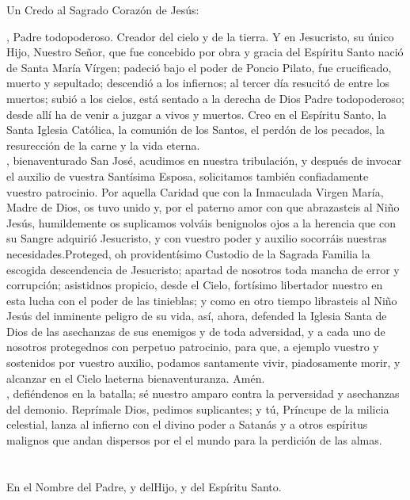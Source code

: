 \documentclass[10pt,a4paper,oneside]{book}
\begin{document}
\bigskip
{\label{creed-apostles}}
Un Credo al Sagrado Corazón de Jesús:\\
\smallskip
\begin{minipage}[t]{0.475\textwidth}
    , Padre todopoderoso. Creador del cielo y de la tierra. Y en Jesucristo, su único Hijo, Nuestro Señor,
    que fue concebido por obra y gracia del Espíritu Santo nació de Santa María Vírgen; padeció bajo el poder de Poncio Pilato,
    fue crucificado, muerto y sepultado; descendió a los infiernos; al tercer día resucitó de entre los muertos; subió a los cielos,
    está sentado a la derecha de Dios Padre todopoderoso; desde allí ha de venir a juzgar a vivos y muertos.
    Creo en el Espíritu Santo, la Santa Iglesia Católica, la comunión de los Santos, el perdón de los pecados,
    la resurección de la carne y la vida eterna. \\

    , bienaventurado San José, acudimos en nuestra tribulación, y después de invocar el auxilio de vuestra Santísima Esposa, solicitamos
    también confiadamente vuestro patrocinio. Por aquella Caridad que con la Inmaculada Virgen María, Madre de Dios, os tuvo unido y, por el paterno amor 
    con que abrazasteis al Niño Jesús, humildemente os suplicamos volváis benignolos ojos a la herencia que con su Sangre adquirió Jesucristo, y con vuestro 
    poder y auxilio socorráis nuestras necesidades.Proteged, oh providentísimo Custodio de la Sagrada Familia la escogida descendencia de Jesucristo; 
    apartad de nosotros toda mancha de error y corrupción; asistidnos propicio, desde el Cielo, fortísimo libertador nuestro en esta lucha con el poder de
    las tinieblas; y como en otro tiempo librasteis al Niño Jesús del inminente peligro de su vida, así, ahora, defended la Iglesia Santa de Dios de las 
    asechanzas de sus enemigos y de toda adversidad, y a cada uno de nosotros protegednos con perpetuo patrocinio, para que, a ejemplo vuestro y sostenidos 
    por vuestro auxilio, podamos santamente vivir, piadosamente morir, y alcanzar en el Cielo laeterna bienaventuranza. Amén.\\

    , defiéndenos en la batalla; sé nuestro amparo contra la perversidad y asechanzas del demonio. Reprímale Dios, pedimos
    suplicantes; y tú, Príncupe de la milicia celestial, lanza al infierno con el divino poder a Satanás y a otros espíritus malignos que andan dispersos por el
    el mundo para la perdición de las almas. \\

    \\

    \\

    En el Nombre del Padre, y del{\redcross}Hijo, y del Espíritu Santo.
\end{minipage}
\end{document}
